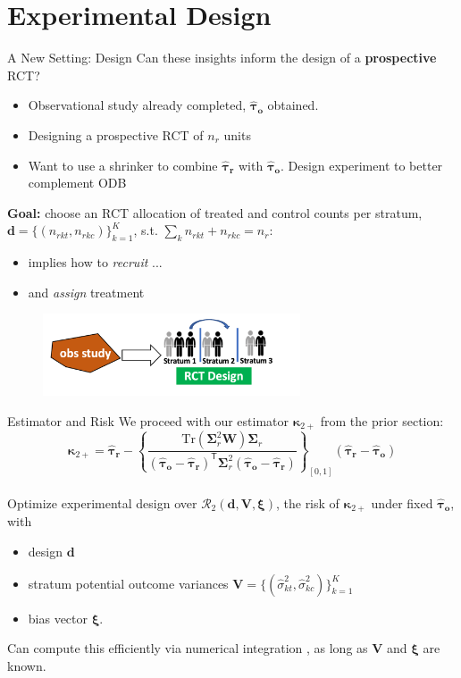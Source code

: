 \documentclass[usenames,dvipsnames]{beamer}
\newcommand{\taur}{\boldsymbol{\hat \tau_r}}
\newcommand{\htaur}{\boldsymbol{\hat \tau_r}}
\newcommand{\tauo}{\boldsymbol{\hat \tau_o}}
\newcommand{\htauo}{\boldsymbol{\hat \tau_o}}
\newcommand{\bsxi}{\boldsymbol{\xi}}
\newcommand{\bsD}{\boldsymbol{W}}
\newcommand{\bsSig}{\boldsymbol{\Sigma}}
\newcommand{\bskap}{\boldsymbol{ \kappa}}
\newcommand{\Tr}{\text{Tr}}
\let\oldcitep=\citep
\renewcommand{\citep}[1]{\textcolor[rgb]{.3,.3,.8}{\oldcitep{#1}}}
\newcommand{\tran}{\mathsf{T}}
\theoremstyle{definition} %
\begin{document}
\section{Experimental Design}


\begin{frame}{A New Setting: Design}
Can these insights inform the design of a \textbf{prospective} RCT? 
\begin{itemize}
\item Observational study already completed, $\tauo$ obtained. 
\item Designing a prospective RCT of $n_r$ units 
\item Want to use a shrinker to combine $\taur$ with $\tauo$. Design experiment to better complement ODB \pause
\end{itemize}
\textbf{Goal:} choose an RCT allocation of treated and control counts per stratum, $\boldsymbol d = \{(n_{rkt}, n_{rkc})\}_{k = 1}^K$, s.t. $\sum_k n_{rkt} + n_{rkc} = n_r$:
\begin{itemize}
\item implies how to \emph{recruit} ... 
\item and \emph{assign} treatment 
\end{itemize}

\begin{figure}
\centering
\includegraphics[width = 0.68\textwidth]{Schematic_2}
\end{figure}
\end{frame}


 
\begin{frame}{Estimator and Risk}
We proceed with our estimator $\bskap_{2+}$ from the prior section:
\[ \bskap_{2+} = \htaur - \left\{ \frac{\Tr(\bsSig_r^2 \bsD)\bsSig_r}{(\htauo - \htaur)^\tran  \bsSig_r^2 (\htauo - \htaur) } \right\}_{[0, 1]} \left( \htaur - \htauo \right)\]
\vspace{3mm} \\ \pause
\noindent Optimize experimental design over $\mathcal{R}_2(\boldsymbol{d}, \boldsymbol V, \bsxi)$, the risk of $\bskap_{2+}$ under fixed $\tauo$, with \pause
\begin{itemize}
\item design $\boldsymbol{d}$ \pause
\item stratum potential outcome variances $\boldsymbol V = \{(\hat \sigma_{kt}^2, \hat \sigma_{kc}^2)\}_{k = 1}^K$ \pause
\item bias vector $\bsxi$.
\end{itemize} \pause
\vspace{2mm}
Can compute this efficiently via numerical integration \citep{bao2013moments}, as long as $\boldsymbol V$ and $\bsxi$ are known. 
\end{frame}
\end{document}
